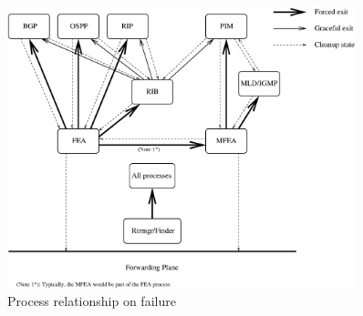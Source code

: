 \documentclass[11pt]{article}
\begin{document}
\begin{figure}
  \begin{center}
    \includegraphics[width=0.9\textwidth]{figs/error_dependency.eps}
    \caption{Process relationship on failure}
    \label{failure_fig}
  \end{center}
\end{figure}
\end{document}
